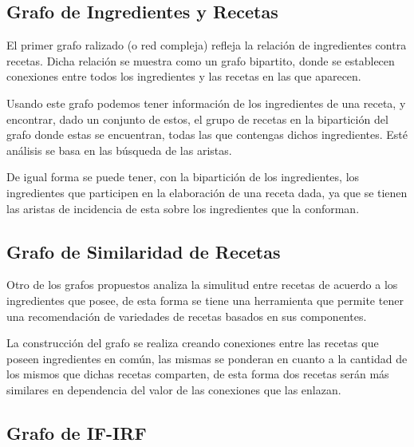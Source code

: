 \documentclass[a4paper]{article}
\begin{document}
\subsection{Grafo de Ingredientes y Recetas}\label{sub:ing-recip-graph}
El primer grafo ralizado (o red compleja) refleja la relación de ingredientes
contra recetas. Dicha relación se muestra como un grafo bipartito, donde se
establecen conexiones entre todos los ingredientes y las recetas en las que
aparecen.

Usando este grafo podemos tener información de los ingredientes de una receta,
y encontrar, dado un conjunto de estos, el grupo de recetas en la bipartición
del grafo donde estas se encuentran, todas las que contengas dichos ingredientes.
Esté análisis se basa en las búsqueda de las aristas.

De igual forma se puede tener, con la bipartición de los ingredientes, los
ingredientes que participen en la elaboración de una receta dada, ya que se
tienen las aristas de incidencia de esta sobre los ingredientes que la conforman.

\subsection{Grafo de Similaridad de Recetas}\label{sub:sim-graph}

Otro de los grafos propuestos analiza la simulitud entre recetas de acuerdo a
los ingredientes que posee, de esta forma se tiene una herramienta que permite
tener una recomendación de variedades de recetas basados en sus componentes.

La construcción del grafo se realiza creando conexiones entre las recetas que
poseen ingredientes en común, las mismas se ponderan en cuanto a la cantidad de
los mismos que dichas recetas comparten, de esta forma dos recetas serán más
similares en dependencia del valor de las conexiones que las enlazan.

\subsection{Grafo de IF-IRF}\label{sub:sim-graph}
\end{document}
